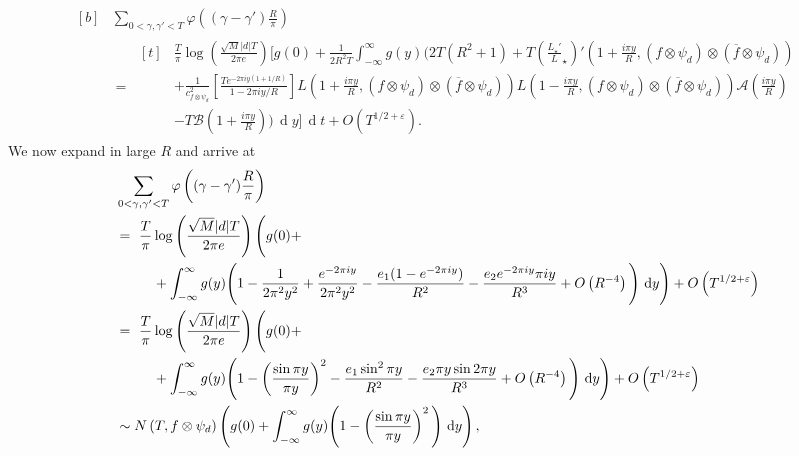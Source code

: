 \documentclass[11pt,reqno]{amsart} \usepackage{fullpage}
\newcommand{\vep}{\varepsilon}
\renewcommand{\d}[1]{\,\operatorname*{d}\!{#1}}
\newcommand\be{\begin{equation}}
\newcommand\ee{\end{equation}}
\newcommand{\Lunram}{L_{\star}}
\numberwithin{equation}{section}
\begin{document}
\be\begin{aligned}[b]
  &\sum_{0<\gamma,\gamma'<T}\varphi\left((\gamma-\gamma')\frac R\pi\right) \\
  &=\ \begin{aligned}[t]
    &\frac T\pi\log\left(\frac{\sqrt M|d|T}{2\pi e}\right)
    \Bigg[g(0)+\frac1{2R^2T}\int_{-\infty}^\infty g(y)\Bigg(
    2T(R^2+1)+T\left(\frac{\Lunram'}\Lunram\right)'
    \left(1+\frac{i\pi y}R,(f\otimes\psi_d)\otimes(\overline f\otimes\psi_d)\right) \\
    &+\frac{1}{c_{f\otimes\psi_d}^2}
    \left[\frac{Te^{-2\pi iy(1+1/R)}}{1-2\pi iy/R}\right]
    L\left(1+\frac{i\pi y}{R},(f\otimes\psi_d)\otimes(\overline f\otimes\psi_d)\right)
    L\left(1-\frac{i\pi y}{R},(f\otimes\psi_d)\otimes(\overline f\otimes\psi_d)\right)
    \mathcal A\left(\frac{i\pi y}{R}\right) \\
    &-T\mathcal B\left(1+\frac{i\pi y}R\right)
    \Bigg)\d y\Bigg]\d t+O\left(T^{1/2+\vep}\right).\end{aligned}\end{aligned}\ee
We now expand in large $R$ and arrive at
\be\begin{aligned}[b]
  &\sum_{0<\gamma,\gamma'<T}\varphi\left((\gamma-\gamma')\frac R\pi\right) \\
  &=\ \begin{multlined}[t]
    \frac T\pi\log\left(\frac{\sqrt M|d|T}{2\pi e}\right)
    \Bigg(g(0)+ \\ +\int_{-\infty}^\infty g(y)\Bigg(
    1-\frac1{2\pi^2y^2}
    +\frac{e^{-2\pi iy}}{2\pi^2y^2}-\frac{e_1(1-e^{-2\pi iy})}{R^2}
    -\frac{e_2 e^{-2\pi i y}\pi i y}{R^3}
    +O\left(R^{-4}\right)
    \Bigg)\d y\Bigg)+O\left(T^{1/2+\vep}\right)\end{multlined} \\
  &=\ \begin{multlined}[0.885\textwidth][t]
    \frac T\pi\log\left(\frac{\sqrt M|d|T}{2\pi e}\right)
    \Bigg(g(0)+ \\ +\int_{-\infty}^\infty g(y)\Bigg(
    1-\left(\frac{\sin\pi y}{\pi y}\right)^2
    -\frac{e_1\sin^2\pi y}{R^2}
    -\frac{e_2\pi y\sin2\pi y}{R^3}
    +O\left(R^{-4}\right)
    \Bigg)\d y\Bigg)
    +O\left(T^{1/2+\vep}\right)\end{multlined} \label{eq:pairexpansion} \\
  &\sim
    N\left(T,f\otimes\psi_d\right)
    \left(g(0)+\int_{-\infty}^\infty g(y)\Bigg(
    1-\left(\frac{\sin\pi y}{\pi y}\right)^2    
    \Bigg)\d y\right),
\end{aligned}\ee
\end{document}
